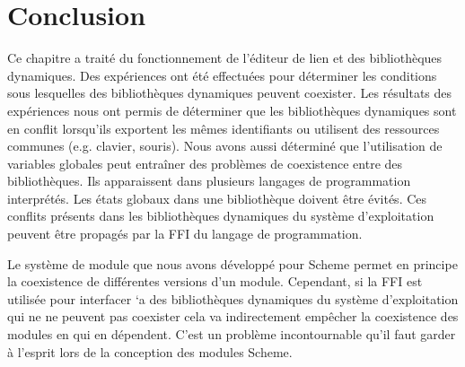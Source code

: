 \section{Conclusion}
%
Ce chapitre a traité du fonctionnement de l'éditeur de lien et des
bibliothèques dynamiques. Des expériences ont été effectuées pour déterminer
les conditions sous lesquelles des bibliothèques dynamiques peuvent
coexister. Les résultats des expériences nous ont permis de déterminer
que les bibliothèques dynamiques sont en conflit lorsqu'ils exportent
les mêmes identifiants ou utilisent des ressources communes (e.g. clavier,
souris).
Nous avons aussi déterminé que l'utilisation de variables globales peut entraîner
des problèmes de coexistence entre des bibliothèques. Ils apparaissent dans
plusieurs langages de programmation interprétés. Les états globaux dans
une bibliothèque doivent être évités.
Ces conflits présents dans les bibliothèques dynamiques
du système d'exploitation peuvent être propagés par la FFI du langage
de programmation.

Le système de module que nous avons développé pour Scheme permet en principe la
coexistence de différentes versions d'un module. Cependant, si la FFI est utilisée
pour interfacer `a des bibliothèques dynamiques du système d'exploitation qui ne
ne peuvent pas coexister cela va indirectement empêcher la coexistence des modules en
qui en dépendent. C'est un problème incontournable qu'il faut garder à l'esprit
lors de la conception des modules Scheme.


